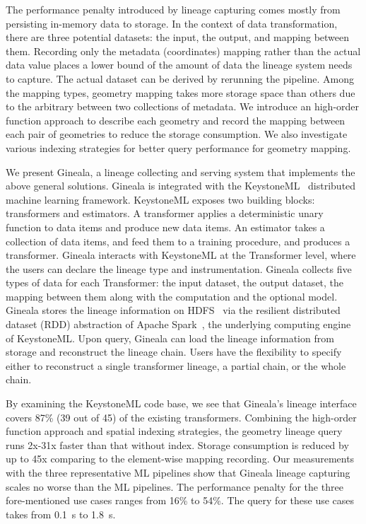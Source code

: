 \documentclass{sig-alternate}
\begin{document}
The performance penalty introduced by lineage capturing comes mostly from persisting in-memory data to storage.
In the context of data transformation, there are three potential datasets: the input, the output, and mapping between them.
Recording only the metadata (coordinates) mapping rather than the actual data value places a lower bound of the amount
of data the lineage system needs to capture. The actual dataset can be derived by rerunning the pipeline.
Among the mapping types, geometry mapping takes more storage space than others due to the arbitrary between two collections
of metadata. We introduce an high-order function approach to describe each geometry and record the mapping between
each pair of geometries to reduce the storage consumption. We also investigate various indexing strategies for better
query performance for geometry mapping.

We present Gineala, a lineage collecting and serving system that implements the above general solutions.
Gineala is integrated with the KeystoneML~\cite{sparks15} distributed machine learning framework.
KeystoneML exposes two building blocks: transformers and estimators. 
A transformer applies a deterministic unary function to data items and produce new data items.
An estimator takes a collection of data items, and feed them to a training procedure,  and produces a transformer.
Gineala interacts with KeystoneML at the Transformer level, where the users can declare the lineage type and instrumentation.
Gineala collects five types of data for each Transformer: the input dataset, the output dataset, the mapping between them
along with the computation and the optional model.
Gineala stores the lineage information on HDFS~\cite{shvachko10} via the resilient distributed dataset (RDD) abstraction
of Apache Spark~\cite{zaharia12}, the underlying computing engine of KeystoneML.
Upon query, Gineala can load the lineage information from storage and reconstruct the lineage chain.
Users have the flexibility to specify either to reconstruct a single transformer lineage, a partial chain, or the whole chain.

By examining the KeystoneML code base, we see that Gineala's lineage interface covers 87\% (39 out of 45) of the existing transformers.
Combining the high-order function approach and spatial indexing strategies, 
the geometry lineage query runs 2x-31x faster than that without index.
Storage consumption is reduced by up to 45x comparing to the element-wise mapping recording. 
Our measurements with the three representative ML pipelines show that Gineala lineage 
capturing scales no worse than the ML pipelines.
The performance penalty for the three fore-mentioned use cases ranges from 16\% to 54\%.
The query for these use cases takes from 0.1~s to 1.8~s. 
\end{document}

